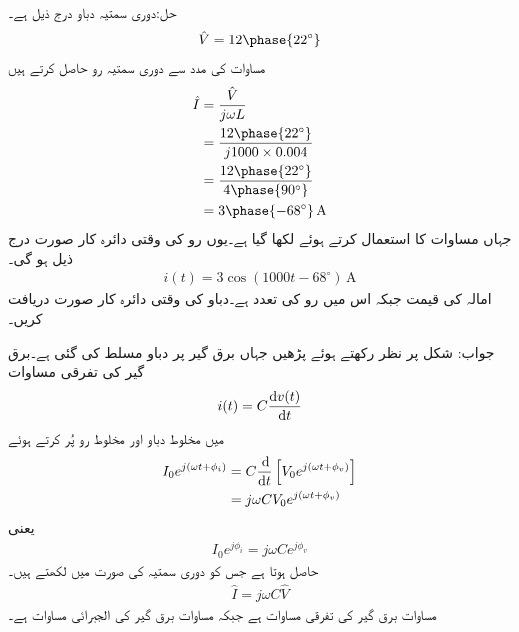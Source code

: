 حل:دوری سمتیہ دباو درج ذیل ہے۔
\begin{align*}
\hat{V}=12\phase{22^{\circ}}
\end{align*}
مساوات  کی مدد سے دوری سمتیہ رو حاصل کرتے ہیں
\begin{align*}
\hat{I}&=\frac{\hat{V}}{j \omega L}\\
&=\frac{12\phase{22^{\circ}}}{j1000\times 0.004}\\
&=\frac{12\phase{22^{\circ}}}{4\phase{90^{\circ}}}\\
&=3\phase{-68^{\circ}} \, \si{\ampere}
\end{align*}
جہاں مساوات  کا استعمال کرتے ہوئے  لکھا گیا  ہے۔یوں رو کی وقتی دائرہ کار صورت درج ذیل ہو گی۔
\begin{align*}
i(t)=3\cos(1000t-68^{\circ}) \, \si{\ampere}
\end{align*}
امالہ کی قیمت  جبکہ اس میں رو  کی تعدد  ہے۔دباو کی وقتی دائرہ کار صورت دریافت کریں۔

جواب:
شکل  پر نظر رکھتے ہوئے پڑھیں جہاں برق گیر پر دباو  مسلط کی گئی ہے۔برق گیر کی تفرقی مساوات
\begin{align}\label{مساوات_بدلتا_برق_گیر_تفرقی_مساوات}
i(t)=C \frac{\dif v(t)}{\dif t}
\end{align}
میں مخلوط دباو اور مخلوط رو پُر کرتے ہوئے
\begin{align*}
I_0 e^{j(\omega t +\phi_i)}&=C \frac{\dif}{\dif t} \left[V_0 e^{j(\omega t +\phi_v)} \right]\\
&=j \omega C V_0 e^{j(\omega t +\phi_v)}
\end{align*}
یعنی
\begin{align*}
I_0 e^{j\phi_i}=j \omega C e^{j \phi_v}
\end{align*}
حاصل ہوتا ہے جس کو دوری سمتیہ کی صورت میں لکھتے ہیں۔
\begin{align}\label{مساوات_بدلتا_برق_گیر_دوری_مساوات_الف}
\hat{I}=j \omega C \hat{V}
\end{align}
مساوات  برق گیر کی تفرقی مساوات ہے جبکہ مساوات  برق گیر کی الجبرائی مساوات ہے۔
 
